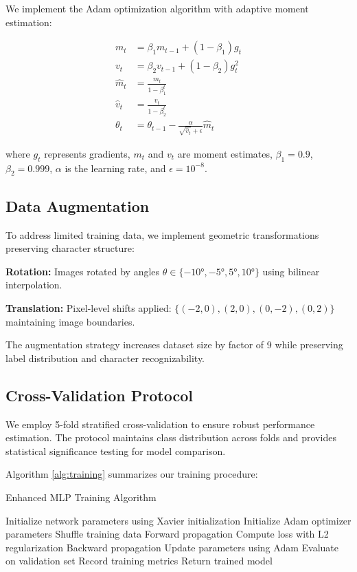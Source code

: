 \documentclass[12pt,a4paper]{article}
\begin{document}
	We implement the Adam optimization algorithm with adaptive moment estimation:
	
	\begin{align}
		m_t &= \beta_1 m_{t-1} + (1-\beta_1)g_t \\
		v_t &= \beta_2 v_{t-1} + (1-\beta_2)g_t^2 \\
		\hat{m}_t &= \frac{m_t}{1-\beta_1^t} \\
		\hat{v}_t &= \frac{v_t}{1-\beta_2^t} \\
		\theta_t &= \theta_{t-1} - \frac{\alpha}{\sqrt{\hat{v}_t} + \epsilon}\hat{m}_t
	\end{align}
	
	where $g_t$ represents gradients, $m_t$ and $v_t$ are moment estimates, $\beta_1 = 0.9$, $\beta_2 = 0.999$, $\alpha$ is the learning rate, and $\epsilon = 10^{-8}$.
	
	\subsection{Data Augmentation}
	
	To address limited training data, we implement geometric transformations preserving character structure:
	
	\textbf{Rotation:} Images rotated by angles $\theta \in \{-10°, -5°, 5°, 10°\}$ using bilinear interpolation.
	
	\textbf{Translation:} Pixel-level shifts applied: $\{(-2,0), (2,0), (0,-2), (0,2)\}$ maintaining image boundaries.
	
	The augmentation strategy increases dataset size by factor of 9 while preserving label distribution and character recognizability.
	
	\subsection{Cross-Validation Protocol}
	
	We employ 5-fold stratified cross-validation to ensure robust performance estimation. The protocol maintains class distribution across folds and provides statistical significance testing for model comparison.
	
	Algorithm \ref{alg:training} summarizes our training procedure:
	
	\begin{algorithm}[H]
		\caption{Enhanced MLP Training Algorithm}
		\label{alg:training}
		\begin{algorithmic}[1]
			\STATE Initialize network parameters using Xavier initialization
			\STATE Initialize Adam optimizer parameters
			\STATE Shuffle training data
			\STATE Forward propagation
			\STATE Compute loss with L2 regularization  
			\STATE Backward propagation
			\STATE Update parameters using Adam
			\ENDFOR
			\STATE Evaluate on validation set
			\STATE Record training metrics
			\ENDFOR
			\STATE Return trained model
		\end{algorithmic}
	\end{algorithm}
	
\end{document}
